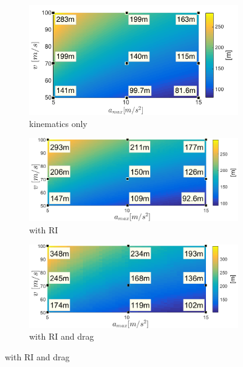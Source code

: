 \documentclass[journal,11pt,onecolumn,draftclsnofoot,]{IEEEtran}
\begin{document}
\begin{figure}
	\centering
	\begin{subfigure}{.45\columnwidth}\centering%
		\includegraphics[width=\columnwidth]{WCMMD_horizontal_kinematics}
		\caption{kinematics only}
		\label{fig:WCMMD_horiz_kinematics}
	\end{subfigure}%
	\hfill
	\begin{subfigure}{.45\columnwidth}\centering
		\includegraphics[width=\columnwidth]{WCMMD_horizontal_RI}
		\caption{with RI}
		\label{fig:WCMMD_horiz_RI}
	\end{subfigure}%
	\hfill
	\begin{subfigure}{.45\columnwidth}\centering
		\includegraphics[width=\columnwidth]{WCMMD_horizontal_RI_drag}
		\caption{with RI and drag}
		\label{fig:WCMMD_horiz_RI_drag}
	\end{subfigure}%

\end{figure}
\end{document}

